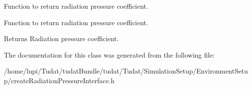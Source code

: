 Function to return radiation pressure coefficient. 

Function to return radiation pressure coefficient. \begin{DoxyReturn}{Returns}
Radiation pressure coefficient. 
\end{DoxyReturn}


The documentation for this class was generated from the following file\+:\begin{DoxyCompactItemize}
\item 
/home/lupi/\+Tudat/tudat\+Bundle/tudat/\+Tudat/\+Simulation\+Setup/\+Environment\+Setup/create\+Radiation\+Pressure\+Interface.\+h\end{DoxyCompactItemize}
